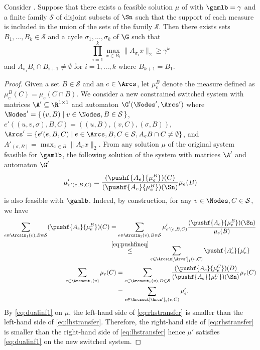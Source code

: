 \begin{proposition}
  \label{prop:Bsc}
  Consider .
  Suppose that there exists a feasible solution $\mu$ of  with $\gamlb = \gamma$
  and a finite family $\mathcal{S}$ of disjoint subsets of $\Sn$ such that
  the support of each measure is included in the union of the sets of the family $\mathcal{S}$.
  Then there exists sets $B_1, \ldots, B_k \in \mathcal{S}$ and a cycle $\sigma_1, \ldots, \sigma_k$ of $\G$ such that
  \[ \prod_{i=1}^k \max_{x \in B_i} \|A_{\sigma_i} x\|_2 \geq \gamma^k \]
  and $A_{\sigma_i} B_i \cap B_{i+1} \neq \emptyset$ for $i=1, \ldots, k$ where $B_{k+1}=B_1$.
  \begin{proof}
    Given a set $B \in \mathcal{S}$ and an \arc{} $e \in \Arcs$, let $\mu_e^B$ denote the measure defined as $\mu_e^B(C) = \mu_e(C \cap B)$.
    We consider a new constrained switched system with matrices $\A' \subseteq \R^{1 \times 1}$ and automaton $\G'(\Nodes', \Arcs')$
    where $\Nodes' = \{\, (v,B) \mid v \in \Nodes, B \in \mathcal{S} \,\}$,
    $e'((u,v,\sigma), B, C) = ((u,B), (v,C), (\sigma,B))$,
    $\Arcs' = \{ e'(e, B, C) \mid e \in \Arcs, B, C \in \mathcal{S}, A_e B \cap C \neq \emptyset \}$,
    and $A'_{(\sigma,B)} = \max_{x \in B} \|A_\sigma x\|_2$.
    From any solution $\mu$ of the original system feasible for $\gamlb$, the following solution of the system with matrices $\A'$ and automaton $\G'$
    \[ \mu'_{e'(e,B,C)} = \frac{(\pushf{A_e}{\mu_e^B})(C)}{(\pushf{A_e}{\mu_e^B})(\Sn)} \mu_e(B) \]
    is also feasible with $\gamlb$.
    Indeed, by construction, for any $v \in \Nodes, C \in \mathcal{S}$, we have
    \begin{align}
        \label{eq:lhstransfer}
        \begin{split}
        \sum_{e \in \Arcsin_{1}(v), B \in \mathcal{S}} (\pushf{A_e}{\mu_e^B})(C)
        & =
        \sum_{e \in \Arcsin_{1}(v), B \in \mathcal{S}} \mu_{e'(e, B, C)}' \frac{(\pushf{A_e}{\mu_e^B})(\Sn)}{\mu_e(B)}\\
        & \stackrel{\eqref{eq:pushfineq}}{\leq}
        \sum_{e \in \Arcsin[\Arcs']_1(v, C)} \pushf{A'_{e}}{\mu_{e}'}
        \end{split}\\
        \label{eq:rhstransfer}
        \begin{split}
        \sum_{e \in \Arcsout_1(v)} \mu_e(C)
        & =
        \sum_{e \in \Arcsout_1(v), D \in \mathcal{S}} \frac{(\pushf{A_e}{\mu_e^C})(D)}{(\pushf{A_e}{\mu_e^C})(\Sn)} \mu_e(C)\\
        & =
        \sum_{e \in \Arcsout[\Arcs']_1(v, C)} \mu_{e}'.
        \end{split}
    \end{align}
    By \eqref{eq:dualinf1} on $\mu$, the left-hand side of \eqref{eq:rhstransfer} is smaller than
    the left-hand side of \eqref{eq:lhstransfer}.
    Therefore, the right-hand side of \eqref{eq:rhstransfer} is smaller than the right-hand side of \eqref{eq:lhstransfer}
    hence $\mu'$ satisfies \eqref{eq:dualinf1} on the new switched system.


\end{proof}
\end{proposition}
